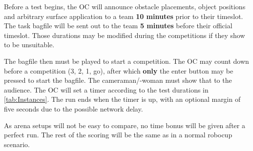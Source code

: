 Before a test begins, the OC will announce obstacle placements, object positions and arbitrary surface application to a team \textbf{10 minutes} prior to their timeslot. The task bagfile will be sent out to the team \textbf{5 minutes}  before their official timeslot. 
Those durations may be modified during the competitions if they show to be unsuitable.

The bagfile then must be played to start a competition. 
The OC may count down before a competition (3, 2, 1, go), after which \textbf{only} the enter button may be pressed to start the bagfile. 
The cameraman/-woman must show that to the audience.
The OC will set a timer according to the test durations in \ref{tab:Instances}. 
The run ends when the timer is up, with an optional margin of five seconds due to the possible network delay.

As arena setups will not be easy to compare, no time bonus will be given after a perfect run. 
The rest of the scoring will be the same as in a normal robocup scenario.

